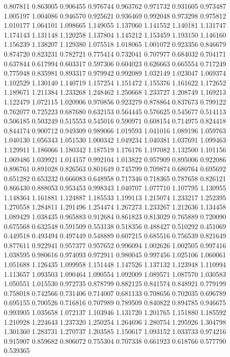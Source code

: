 0.807811
0.863005
0.906455
0.976744
0.963762
0.971732
0.931605
0.973487
1.005197
1.004086
0.946570
0.925621
0.936469
0.992048
0.973298
0.975812
1.010177
1.064101
1.098665
1.149055
1.137060
1.141552
1.140181
1.131747
1.174143
1.131148
1.120258
1.137804
1.145212
1.153459
1.193150
1.146160
1.156239
1.138207
1.129380
1.075518
1.018065
1.001072
0.923356
0.846679
0.874720
0.823231
0.782721
0.775414
0.732041
0.707977
0.684032
0.704171
0.637844
0.617994
0.603317
0.597306
0.604023
0.626663
0.665554
0.717249
0.775948
0.835981
0.893317
0.979942
0.992089
1.032149
1.023047
1.069374
1.102529
1.130140
1.140719
1.157254
1.151472
1.155376
1.161622
1.172652
1.189671
1.211384
1.233268
1.248462
1.250668
1.233727
1.208749
1.169213
1.122479
1.072115
1.020906
0.970856
0.923279
0.878864
0.837673
0.799122
0.762077
0.725223
0.687680
0.632153
0.564445
0.576625
0.545677
0.514113
0.506185
0.503249
0.515553
0.545016
0.590971
0.608154
0.714975
0.824418
0.844174
0.900712
0.949309
0.989066
1.019593
1.041016
1.089196
1.059763
1.040130
1.056343
1.051530
1.000342
1.049234
1.040381
1.037691
1.099463
1.129911
1.186066
1.180342
1.187519
1.176176
1.197082
1.132500
1.101156
1.069486
1.039921
1.014157
0.992104
1.013822
0.957909
0.895006
0.922086
0.896761
0.891028
0.826563
0.801649
0.745799
0.709874
0.680764
0.695692
0.651282
0.653232
0.666083
0.648958
0.717346
0.718365
0.787658
0.826121
0.866430
0.888053
0.953453
0.998343
1.040707
1.077710
1.107795
1.130955
1.148364
1.161881
1.124887
1.185533
1.199113
1.215074
1.233217
1.252395
1.270558
1.284811
1.291496
1.254474
1.267273
1.233267
1.212636
1.134458
1.089429
1.038435
0.965883
0.912684
0.861823
0.813029
0.765889
0.720090
0.675568
0.632548
0.591509
0.553138
0.518356
0.488427
0.510292
0.451069
0.449518
0.493494
0.497449
0.548889
0.607215
0.685516
0.756539
0.821649
0.877611
0.922941
0.957377
0.957652
0.996094
1.002626
1.002505
0.997416
1.038595
0.980616
0.974093
0.972911
0.980045
0.997456
1.025106
1.060061
1.051688
1.126435
1.099958
1.151448
1.147526
1.137132
1.123948
1.110994
1.113657
1.093503
1.090464
1.090554
1.092009
1.089571
1.087570
1.030583
1.050551
1.015530
0.972735
0.878799
0.882125
0.841574
0.848921
0.779199
0.758018
0.742566
0.731406
0.714007
0.681133
0.708656
0.702035
0.696789
0.695155
0.700526
0.716816
0.707989
0.789509
0.840822
0.894785
0.946675
0.993905
1.035658
1.072137
1.103946
1.131720
1.201765
1.151880
1.185592
1.210928
1.224643
1.237320
1.250254
1.264696
1.280754
1.295926
1.304798
1.301360
1.283731
1.270737
1.203585
1.150617
1.093152
1.033733
0.974216
0.915907
0.859682
0.806072
0.755304
0.707338
0.661923
0.618766
0.577790
0.539365
